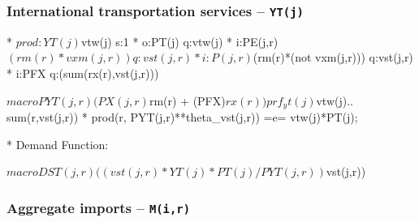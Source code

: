 \subsubsection*{International transportation services -- \texttt{YT(j)}}

\begin{GAMSCode*}
*       $prod:YT(j)$vtw(j)  s:1
*               o:PT(j)                         q:vtw(j)
*               i:PE(j,r)$(rm(r)*vxm(j,r))      q:vst(j,r)
*               i:P(j,r)$(rm(r)*(not vxm(j,r))) q:vst(j,r)
*               i:PFX                           q:(sum(rx(r),vst(j,r)))


$macro PYT(j,r) (PX(j,r)$rm(r) + (PFX)$rx(r))

prf_yt(j)$vtw(j).. sum(r,vst(j,r)) *
        prod(r, PYT(j,r)**theta_vst(j,r)) =e= vtw(j)*PT(j);

*       Demand Function:

$macro DST(j,r)    ((vst(j,r)*YT(j)*PT(j)/PYT(j,r))$vst(j,r))
\end{GAMSCode*}

\subsubsection*{Aggregate imports -- \texttt{M(i,r)}}

